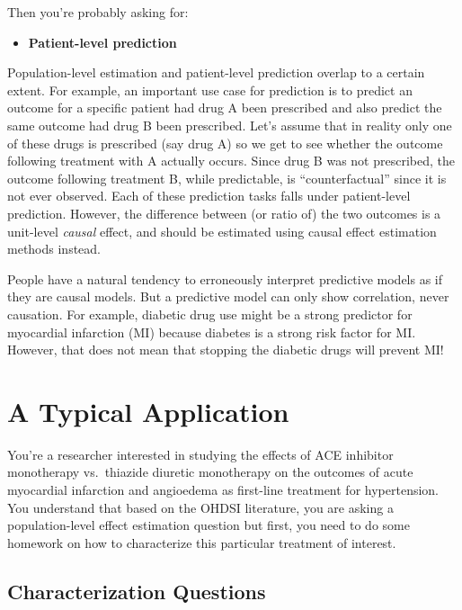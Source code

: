 \documentclass[11pt]{book}
\providecommand{\tightlist}{%
  \setlength{\itemsep}{0pt}\setlength{\parskip}{0pt}}
\theoremstyle{definition}
\theoremstyle{definition}
\theoremstyle{definition}
\theoremstyle{remark}
\let\BeginKnitrBlock\begin \let\EndKnitrBlock\end
\begin{document}
Then you're probably asking for:

\begin{itemize}
\tightlist
\item
  \textbf{Patient-level prediction}
\end{itemize}

Population-level estimation and patient-level prediction overlap to a certain extent. For example, an important use case for prediction is to predict an outcome for a specific patient had drug A been prescribed and also predict the same outcome had drug B been prescribed. Let's assume that in reality only one of these drugs is prescribed (say drug A) so we get to see whether the outcome following treatment with A actually occurs. Since drug B was not prescribed, the outcome following treatment B, while predictable, is ``counterfactual'' since it is not ever observed. Each of these prediction tasks falls under patient-level prediction. However, the difference between (or ratio of) the two outcomes is a unit-level \emph{causal} effect, and should be estimated using causal effect estimation methods instead.

\BeginKnitrBlock{rmdimportant}
People have a natural tendency to erroneously interpret predictive models as if they are causal models. But a predictive model can only show correlation, never causation. For example, diabetic drug use might be a strong predictor for myocardial infarction (MI) because diabetes is a strong risk factor for MI. However, that does not mean that stopping the diabetic drugs will prevent MI!
\EndKnitrBlock{rmdimportant}

\hypertarget{a-typical-application}{%
\section{A Typical Application}\label{a-typical-application}}

You're a researcher interested in studying the effects of ACE inhibitor monotherapy vs.~thiazide diuretic monotherapy on the outcomes of acute myocardial infarction and angioedema as first-line treatment for hypertension. You understand that based on the OHDSI literature, you are asking a population-level effect estimation question but first, you need to do some homework on how to characterize this particular treatment of interest.

\hypertarget{characterization-questions}{%
\subsection{Characterization Questions}\label{characterization-questions}}
\end{document}
